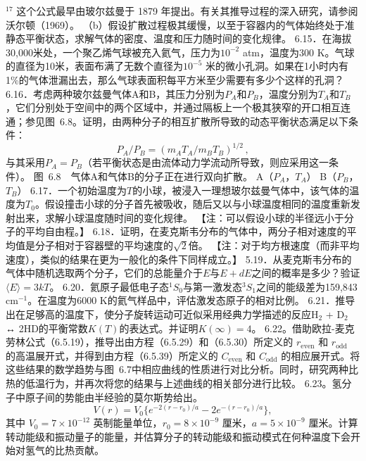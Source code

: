 \(^{17}\) 这个公式最早由玻尔兹曼于 1879 年提出。有关其推导过程的深入研究，请参阅沃尔顿（1969）。
（b）假设扩散过程极其缓慢，以至于容器内的气体始终处于准静态平衡状态，求解气体的密度、温度和压力随时间的变化规律。
6.15．在海拔30,000米处，一个聚乙烯气球被充入氦气，压力为\(10^{-2}\) atm，温度为300 K。气球的直径为10米，表面布满了无数个直径为\(10^{-5}\) 米的微小孔洞。如果在1小时内有1\%的气体泄漏出去，那么气球表面积每平方米至少需要有多少个这样的孔洞？
6.16．考虑两种玻尔兹曼气体A和B，其压力分别为\(P_A\)和\(P_B\)，温度分别为\(T_A\)和\(T_B\)，它们分别处于空间中的两个区域中，并通过隔板上一个极其狭窄的开口相互连通；参见图~6.8。证明，由两种分子的相互扩散所导致的动态平衡状态满足以下条件：
\begin{equation}\tag{6.6.33}\label{eq:6.6.33}
P _ { A } / P _ { B } = ( m _ { A } T _ { A } / m _ { B } T _ { B } ) ^{1 / 2} \, ,
\end{equation}
与其采用\(P_{A}=P_{B}\)（若平衡状态是由流体动力学流动所导致，则应采用这一条件）。
图~6.8　气体A和气体B的分子正在进行双向扩散。
A（\(P_A\)，\(T_A\)）
B（\(P_B\)，\(T_B\)）
6.17．一个初始温度为\(T\)的小球，被浸入一理想玻尔兹曼气体中，该气体的温度为\(T_0\)。假设撞击小球的分子首先被吸收，随后又以与小球温度相同的温度重新发射出来，求解小球温度随时间的变化规律。
【注：可以假设小球的半径远小于分子的平均自由程。】
6.18．证明，在麦克斯韦分布的气体中，两分子相对速度的平均值是分子相对于容器壁的平均速度的\(\sqrt{2}\)倍。
【注：对于均方根速度（而非平均速度），类似的结果在更为一般化的条件下同样成立。】
5.19．从麦克斯韦分布的气体中随机选取两个分子，它们的总能量介于\(E\)与\(E + dE\)之间的概率是多少？验证\(\langle E \rangle = 3kT\)。
6.20．氦原子最低电子态\(^{1}S_{0}\)与第一激发态\(^{3}S_{1}\)之间的能级差为159,843 cm\(^{-1}\)。在温度为6000 K的氦气样品中，评估激发态原子的相对比例。
6.21．推导出在足够高的温度下，使分子旋转运动可近似采用经典力学描述的反应H\(_2\) + D\(_2\) ↔ 2HD的平衡常数\(K(T)\)的表达式。并证明\(K(\infty) = 4\)。
6.22。借助欧拉-麦克劳林公式（6.5.19），推导出由方程（6.5.29）和（6.5.30）所定义的 \(r_{\mathrm{even}}\) 和 \(r_{\mathrm{odd}}\) 的高温展开式，并得到由方程（6.5.39）所定义的 \(C_{\mathrm{even}}\) 和 \(C_{\mathrm{odd}}\) 的相应展开式。将这些结果的数学趋势与图~6.7中相应曲线的性质进行对比分析。同时，研究两种比热的低温行为，并再次将您的结果与上述曲线的相关部分进行比较。
6.23。氢分子中原子间的势能由半经验的莫尔斯势给出。
\begin{equation}\tag{6.6.34}\label{eq:6.6.34}
V ( r ) = V _ { 0 } \{ e ^{- 2 ( r - r _ { 0} ) / a } - 2 e ^{- ( r - r _ { 0} ) / a } \} ,
\end{equation}
其中 \(V_{0}=7\times10^{-12}\) 英制能量单位，\(r_{0}=8\times10^{-9}\) 厘米，\(a=5\times10^{-9}\) 厘米。计算转动能级和振动量子的能量，并估算分子的转动能级和振动模式在何种温度下会开始对氢气的比热贡献。
